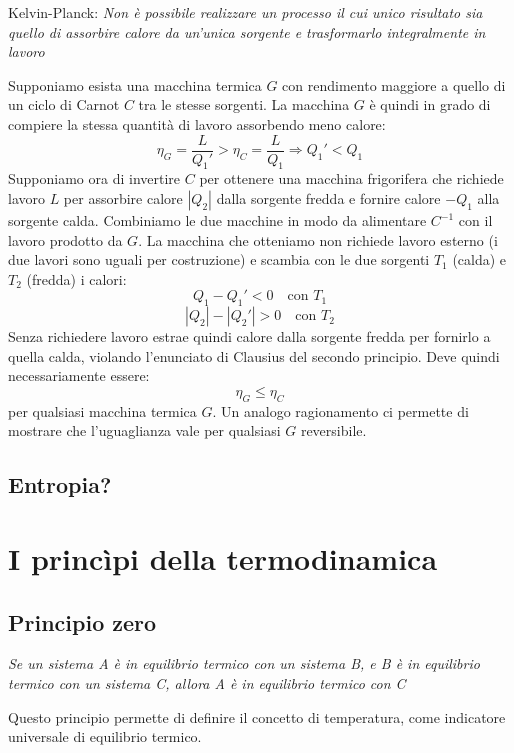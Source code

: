 \documentclass{article}
\begin{document}
\begin{center}
    Kelvin-Planck: \textit{Non è possibile realizzare un processo il cui unico risultato sia quello di assorbire calore da un'unica sorgente e trasformarlo integralmente in lavoro}
\end{center}
Supponiamo esista una macchina termica $G$ con rendimento maggiore a quello di un ciclo di Carnot $C$ tra le stesse sorgenti. La macchina $G$ è quindi in grado di compiere la stessa quantità di lavoro assorbendo meno calore:
$$ \eta_G=\frac{L}{Q_1'}>\eta_C=\frac{L}{Q_1} \Rightarrow Q_1'<Q_1$$
Supponiamo ora di invertire $C$ per ottenere una macchina frigorifera che richiede lavoro $L$ per assorbire calore $|Q_2|$ dalla sorgente fredda e fornire calore $-Q_1$ alla sorgente calda. Combiniamo le due macchine in modo da alimentare $C^{-1}$ con il lavoro prodotto da $G$. La macchina che otteniamo non richiede lavoro esterno (i due lavori sono uguali per costruzione) e scambia con le due sorgenti $T_1$ (calda) e $T_2$ (fredda) i calori:
$$ Q_1 - Q_1' < 0 \quad\text{con $T_1$} $$
$$ |Q_2|-|Q_2'| > 0 \quad\text{con $T_2$} $$
Senza richiedere lavoro estrae quindi calore dalla sorgente fredda per fornirlo a quella calda, violando l'enunciato di Clausius del secondo principio. Deve quindi necessariamente essere:
$$  \eta_G\leq\eta_C $$
per qualsiasi macchina termica $G$. Un analogo ragionamento ci permette di mostrare che l'uguaglianza vale per qualsiasi $G$ reversibile.

\subsection{Entropia?}




\section{I princìpi della termodinamica}

\subsection{Principio zero}
\begin{center}
    \textit{Se un sistema A è in equilibrio termico con un sistema B, e B è in equilibrio termico con un sistema C, allora A è in equilibrio termico con C}
\end{center}
Questo principio permette di definire il concetto di temperatura, come indicatore universale di equilibrio termico.
\end{document}
